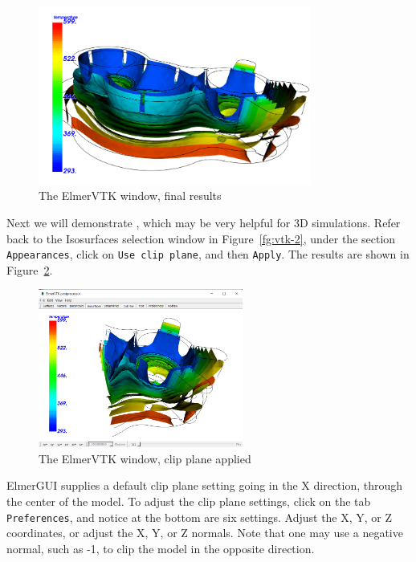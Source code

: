 \begin{figure}[H]
\begin{center}
\includegraphics[width=0.8\textwidth]{vtk-6}
\caption{The ElmerVTK window, final results}\label{fg:vtk-6}
\end{center}
\end{figure}

\newpage

Next we will demonstrate , which may be very helpful for 3D simulations.  Refer back to the Isosurfaces selection window in Figure~\ref{fg:vtk-2}, under the section \texttt{Appearances}, click on \texttt{Use clip plane}, and then \texttt{Apply}.  The results are shown in Figure~\ref{fg:vtk-7}.

\begin{figure}[H]
\begin{center}
\includegraphics[width=0.6\textwidth]{vtk-7}
\caption{The ElmerVTK window, clip plane applied}\label{fg:vtk-7}
\end{center}
\end{figure}

ElmerGUI supplies a default clip plane setting going in the X direction, through the center of the model.  To adjust the clip plane settings, click on the tab \texttt{Preferences}, and notice at the bottom are six settings.  Adjust the X, Y, or Z coordinates, or adjust the X, Y, or Z normals.  Note that one may use a negative normal, such as -1, to clip the model in the opposite direction.

